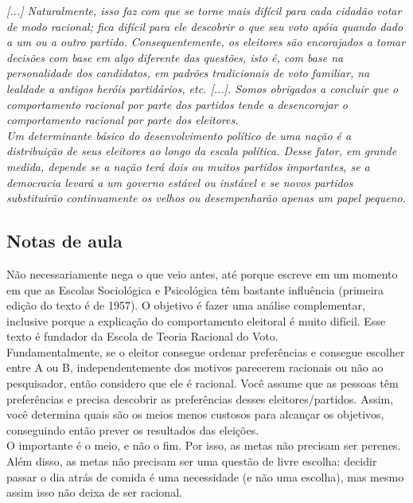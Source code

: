 \textit{[...] Naturalmente, isso faz com que se torne mais difícil para cada cidadão votar de modo racional; fica difícil para ele descobrir o que seu voto apóia quando dado a um ou a outro partido. Consequentemente, os eleitores são encorajados a tomar decisões com base em algo diferente das questões, isto é, com base na personalidade dos candidatos, em padrões tradicionais de voto familiar, na lealdade a antigos heróis partidários, etc. [...]. Somos obrigados a concluir que o comportamento racional por parte dos partidos tende a desencorajar o comportamento racional por parte dos eleitores.} \cite[~p. 157]{downs} \\

\noindent \textit{Um determinante básico do desenvolvimento político de uma nação é a distribuição de seus eleitores ao longo da escala política. Desse fator, em grande medida, depende se a nação terá dois ou muitos partidos importantes, se a democracia levará a um governo estável ou instável e se novos partidos substituirão continuamente os velhos ou desempenharão apenas um papel pequeno.} \cite[~p. 162]{downs}

\subsection{Notas de aula}

\noindent Não necessariamente nega o que veio antes, até porque escreve em um momento em que as Escolas Sociológica e Psicológica têm bastante influência (primeira edição do texto é de 1957). O objetivo é fazer uma análise complementar, inclusive porque a explicação do comportamento eleitoral é muito difícil. Esse texto é fundador da Escola de Teoria Racional do Voto. \\

\noindent Fundamentalmente, se o eleitor consegue ordenar preferências e consegue escolher entre A ou B, independentemente dos motivos parecerem racionais ou não ao pesquisador, então considero que ele é racional. Você assume que as pessoas têm preferências e precisa descobrir as preferências desses eleitores/partidos. Assim, você determina quais são os meios menos custosos para alcançar os objetivos, conseguindo então prever os resultados das eleições. \\

\noindent O importante é o meio, e não o fim. Por isso, as metas não precisam ser perenes. Além disso, as metas não precisam ser uma questão de livre escolha: decidir passar o dia atrás de comida é uma necessidade (e não uma escolha), mas mesmo assim isso não deixa de ser racional.

